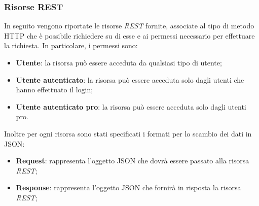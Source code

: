 \subsubsection{Risorse REST}
In seguito vengono riportate le risorse \textit{REST} fornite, associate al tipo di metodo HTTP che è possibile richiedere su di esse e ai permessi necessario per effettuare la richiesta. In particolare, i permessi sono:
\begin{itemize}
	\item \textbf{Utente}: la risorsa può essere acceduta da qualsiasi tipo di utente;
	\item \textbf{Utente autenticato}: la risorsa può essere acceduta solo dagli utenti che hanno effettuato il login;
	\item \textbf{Utente autenticato pro}: la risorsa può essere acceduta solo dagli utenti pro.
\end{itemize}
Inoltre per ogni risorsa sono stati specificati i formati per lo scambio dei dati in JSON:
\begin{itemize}
	\item \textbf{Request}: rappresenta l'oggetto JSON che dovrà essere passato alla risorsa \textit{REST};
	\item \textbf{Response}: rappresenta l'oggetto JSON che fornirà in risposta la risorsa \textit{REST};
	
	
	
	
	
	
	
	
	
	
	
	
	
	
	
	
	
\end{itemize}